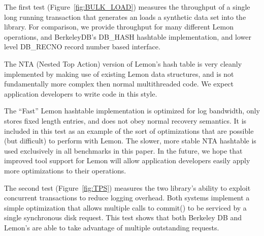 \documentclass[letterpaper,twocolumn,english]{article}
\newcommand{\yad}{Lemon\xspace}
\begin{document}
The first test (Figure~\ref{fig:BULK_LOAD}) measures the throughput of a single long running
transaction that generates an loads a synthetic data set into the
library.  For comparison, we provide throughput for many different
\yad operations, and BerkeleyDB's DB\_HASH hashtable implementation,
and lower level DB\_RECNO record number based interface.

The NTA (Nested Top Action) version of \yad's hash table is very
cleanly implemented by making use of existing \yad data structures,
and is not fundamentally more complex then normal multithreaded code.
We expect application developers to write code in this style.  

The ``Fast'' \yad hashtable implementation is optimized for log
bandwidth, only stores fixed length entries, and does not obey normal
recovery semantics.  It is included in this test as an example of the
sort of optimizations that are possible (but difficult) to perform
with \yad.  The slower, more stable NTA hashtable is used exclusively
in all benchmarks in this paper.  In the future, we hope that improved
tool support for \yad will allow application developers easily apply
more optimizations to their operations.


The second test (Figure~\ref{fig:TPS}) measures the two library's ability to exploit
concurrent transactions to reduce logging overhead.  Both systems
implement a simple optimization that allows multiple calls to commit()
to be serviced by a single synchronous disk request.  This test shows
that both Berkeley DB and \yad's are able to take advantage of
multiple outstanding requests.
\end{document}

